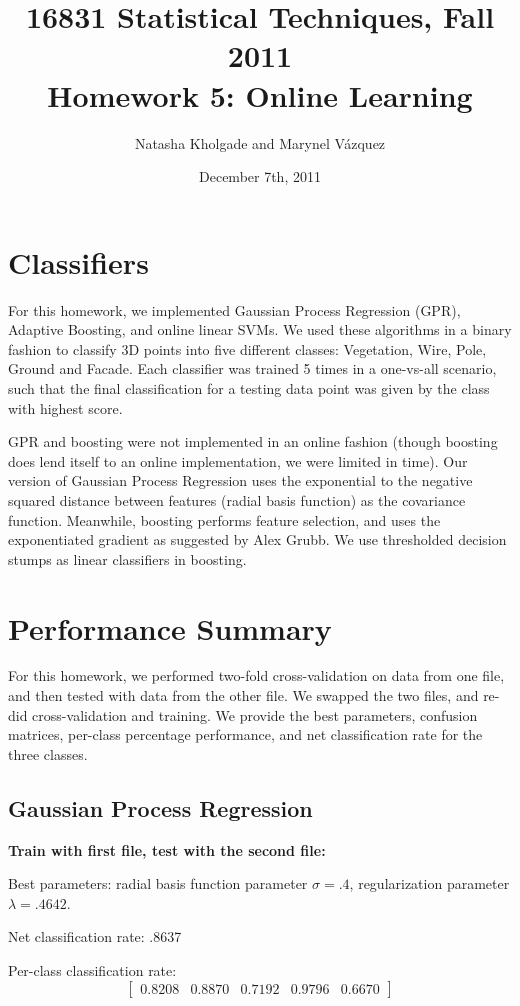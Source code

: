\documentclass[letterpaper]{article}
\title{16831 Statistical Techniques, Fall 2011\\Homework 5: Online Learning}
\date{December 7th, 2011}
\author{Natasha Kholgade and Marynel V\'azquez}
\begin{document}
\maketitle

\section*{Classifiers}

For this homework, we implemented Gaussian Process Regression (GPR),
Adaptive Boosting, and online linear SVMs. We used these algorithms in a binary
fashion to classify 3D points into five different classes: Vegetation,
Wire, Pole, Ground and Facade. Each classifier was trained 5 times in
a one-vs-all scenario, such that the final classification for a
testing data point was given by the class with highest score.

GPR and boosting were not implemented in an online fashion (though
boosting does lend itself to an online implementation, we were limited
in time). Our version of Gaussian Process Regression uses the
exponential to the negative squared distance between features (radial
basis function) as the covariance function. Meanwhile, boosting
performs feature selection, and uses the exponentiated gradient as
suggested by Alex Grubb. We use thresholded decision stumps as linear
classifiers in boosting.

\section*{Performance Summary}

For this homework, we performed two-fold cross-validation on data from one file, and then tested with data from the other file. We swapped the two files, and re-did cross-validation and training. We provide the best parameters, confusion matrices, per-class percentage performance, and net classification rate for the three classes. 

\subsection*{Gaussian Process Regression}

\textbf{Train with first file, test with the second file:}

Best parameters: radial basis function parameter $\sigma=.4$, regularization parameter $\lambda=.4642$.

Net classification rate: .8637

Per-class classification rate: 
$$\begin{bmatrix}0.8208   & 0.8870  &  0.7192   & 0.9796 &   0.6670\end{bmatrix}$$
\end{document}
